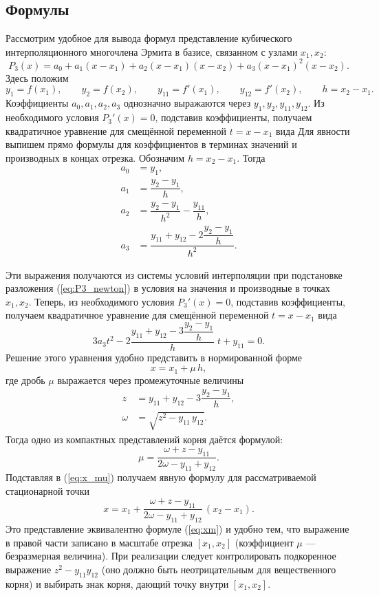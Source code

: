 \documentclass[a4paper,12pt]{article}
\begin{document}
\subsection*{Формулы}
Рассмотрим удобное для вывода формул представление кубического интерполяционного многочлена Эрмита в базисе, связанном с узлами $x_1,x_2$:
\begin{equation}\label{eq:P3_newton}
P_3(x)=a_0 + a_1(x-x_1)+a_2(x-x_1)(x-x_2)+a_3(x-x_1)^2(x-x_2).
\end{equation}
Здесь положим
\[y_1=f(x_1),\qquad y_2=f(x_2),\qquad y_{11}=f'(x_1),\qquad y_{12}=f'(x_2),\qquad h=x_2-x_1.\]
Коэффициенты $a_0,a_1,a_2,a_3$ однозначно выражаются через $y_1,y_2,y_{11},y_{12}$. Из необходимого условия $P_3'(x)=0$, подставив коэффициенты, получаем квадратичное уравнение для смещённой переменной $t=x-x_1$ вида
Для явности выпишем прямо формулы для коэффициентов в терминах значений и производных в концах отрезка. Обозначим $h=x_2-x_1$. Тогда
\begin{align}
a_0 &= y_1, \\
a_1 &= \dfrac{y_2-y_1}{h}, \\
a_2 &= \dfrac{y_2-y_1}{h^2} - \dfrac{y_{11}}{h}, \\
a_3 &= \dfrac{y_{11}+y_{12} - 2\dfrac{y_2-y_1}{h}}{h^2}.
\end{align}

Эти выражения получаются из системы условий интерполяции при подстановке разложения (\ref{eq:P3_newton}) в условия на значения и производные в точках $x_1,x_2$. Теперь, из необходимого условия $P_3'(x)=0$, подставив коэффициенты, получаем квадратичное уравнение для смещённой переменной $t=x-x_1$ вида
\begin{equation}\label{eq:quad_t}
3a_3 t^2 - 2\frac{y_{11}+y_{12}-3\dfrac{y_2-y_1}{h}}{h}\;t + y_{11}=0.
\end{equation}
Решение этого уравнения удобно представить в нормированной форме
\begin{equation}\label{eq:x_mu}
x = x_1 + \mu\,h,
\end{equation}
где дробь $\mu$ выражается через промежуточные величины
\begin{align}
z &= y_{11}+y_{12}-3\dfrac{y_2-y_1}{h},\\
\omega &= \sqrt{z^2 - y_{11}\,y_{12}}.
\end{align}
Тогда одно из компактных представлений корня даётся формулой:
\begin{equation}\label{eq:mu_formula}
\mu = \frac{\omega + z - y_{11}}{2\omega - y_{11} + y_{12}}.
\end{equation}
Подставляя в (\ref{eq:x_mu}) получаем явную формулу для рассматриваемой стационарной точки
\[ x = x_1 + \frac{\omega + z - y_{11}}{2\omega - y_{11} + y_{12}}\, (x_2-x_1). \]
Это представление эквивалентно формуле (\ref{eq:xm}) и удобно тем, что выражение в правой части записано в масштабе отрезка $[x_1,x_2]$ (коэффициент $\mu$ — безразмерная величина). При реализации следует контролировать подкоренное выражение $z^2-y_{11}y_{12}$ (оно должно быть неотрицательным для вещественного корня) и выбирать знак корня, дающий точку внутри $[x_1,x_2]$.
\end{document}
